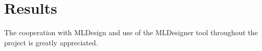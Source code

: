 \section*{Results}
The cooperation with MLDesign and use of the MLDesigner tool throughout the project is greatly appreciated.


